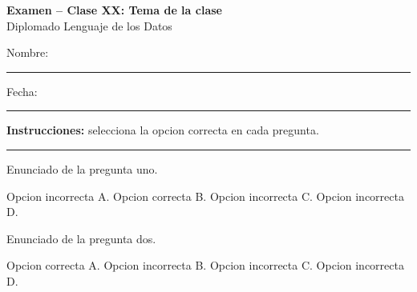 \documentclass[12pt,addpoints]{exam}
\begin{document}
\begin{center}
  {\color{molMorado}\Large\bfseries Examen -- Clase XX: Tema de la clase}\\[3pt]
  {\color{molTeal}\large Diplomado Lenguaje de los Datos}
\end{center}

\vspace{6pt}
\noindent Nombre: \rule{6cm}{0.4pt} \hfill Fecha: \rule{3cm}{0.4pt}

\vspace{6pt}
\noindent\textbf{Instrucciones:} selecciona la opcion correcta en cada pregunta.

\vspace{4pt}
\hrule
\vspace{8pt}

\begin{questions}

\question[1] Enunciado de la pregunta uno.
\begin{choices}
  \choice Opcion incorrecta A.
  \CorrectChoice Opcion correcta B.
  \choice Opcion incorrecta C.
  \choice Opcion incorrecta D.
\end{choices}

\question[1] Enunciado de la pregunta dos.
\begin{choices}
  \CorrectChoice Opcion correcta A.
  \choice Opcion incorrecta B.
  \choice Opcion incorrecta C.
  \choice Opcion incorrecta D.
\end{choices}

\end{questions}
\end{document}
